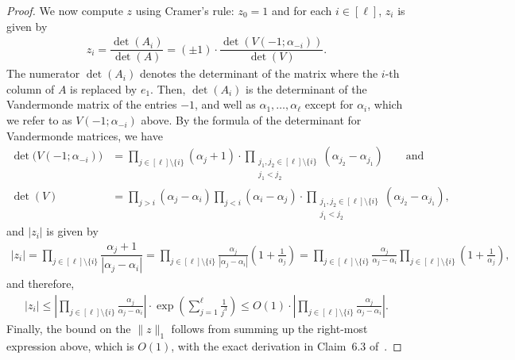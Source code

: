 \begin{proof}
We now compute $z$ using Cramer's rule: $z_0=1$ and for each $i\in [\ell]$, $z_i$ is given by
\begin{align*}
z_i = \dfrac{\det(A_i)}{\det(A)} = (\pm 1)\cdot \dfrac{\det(V(-1; \alpha_{-i}))}{\det(V )}.
\end{align*}
The numerator $\det(A_i)$ denotes the determinant of the matrix where the $i$-th column of $A$ is replaced by $e_1$. Then, $\det(A_i)$ is the determinant of the Vandermonde matrix of the entries $-1$, and well as $\alpha_1,\dots, \alpha_{\ell}$ except for $\alpha_i$, which we refer  to as $V(-1;\alpha_{-i})$ above. By the formula of the determinant for Vandermonde matrices, we have 
\begin{align*}
\det\big(V(-1; \alpha_{-i})\big) &= \prod_{j \in [\ell] \setminus \{i \}} (\alpha_j + 1) \cdot \prod_{\substack{j_1, j_2 \in [\ell] \setminus \{i\} \\ j_1 < j_2}} (\alpha_{j_2} - \alpha_{j_1}) \qquad\text{and}\\[0.6ex]
\det(V ) &= \prod_{j > i} (\alpha_{j} - \alpha_i) \prod_{j < i} (\alpha_i - \alpha_j) \cdot \prod_{\substack{j_1, j_2 \in [\ell] \setminus \{i\} \\ j_1 < j_2}} (\alpha_{j_2} - \alpha_{j_1}),
\end{align*}
and $|z_i|$ is given by 
\begin{align*}
|z_i| = \prod_{j \in [\ell] \setminus \{i \}} \dfrac{\alpha_j + 1}{|\alpha_j - \alpha_i|} = \prod_{j \in [\ell] \setminus \{i\}} \frac{\alpha_j}{|\alpha_j - \alpha_i|} \left( 1 + \frac{1}{\alpha_j} \right) = \prod_{j \in [\ell] \setminus \{i\}} \frac{\alpha_j}{\alpha_j - \alpha_i} \prod_{j \in [\ell] \setminus \{i\}} \left( 1 + \frac{1}{\alpha_j} \right),
\end{align*}
and therefore,
\begin{align*}
    |z_i| \leq \left| \prod_{j \in [\ell]\setminus\{i\}} \frac{\alpha_j}{\alpha_j - \alpha_i} \right| \cdot \exp\left( \sum_{j=1}^{\ell} \frac{1}{j^3} \right) \leq O(1) \cdot \left| \prod_{j \in [\ell]\setminus\{i\}} \frac{\alpha_j}{\alpha_j - \alpha_i} \right|.
\end{align*}
Finally, the bound on the $\|z\|_1$ follows from summing up the right-most expression above, which is $O(1)$, with the exact derivation in Claim~6.3 of~\cite{CJLW21b}.
\end{proof}


